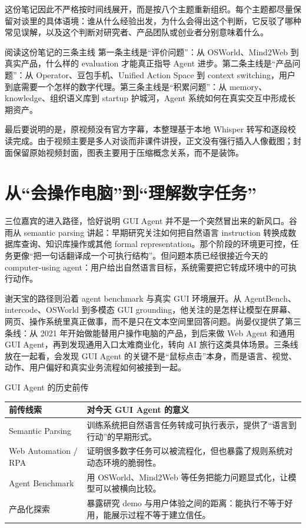 \documentclass[a4paper]{article}
\begin{document}
这份笔记因此不严格按时间线展开，而是按八个主题重新组织。每个主题都尽量保留对谈里的具体语境：谁从什么经验出发，为什么会得出这个判断，它反驳了哪种常见误解，以及这个判断对研究者、产品团队或创业者分别意味着什么。

\begin{importantbox}{阅读这份笔记的三条主线}
第一条主线是“评价问题”：从 OSWorld、Mind2Web 到真实产品，什么样的 evaluation 才能真正指导 Agent 进步。第二条主线是“产品问题”：从 Operator、豆包手机、Unified Action Space 到 context switching，用户到底需要一个怎样的数字代理。第三条主线是“积累问题”：从 memory、knowledge、组织语义库到 startup 护城河，Agent 系统如何在真实交互中形成长期资产。
\end{importantbox}

最后要说明的是，原视频没有官方字幕，本整理基于本地 Whisper 转写和逐段校读完成。由于视频主要是多人对谈而非课件讲授，正文没有强行插入人像截图；封面保留原始视频封面，图表主要用于压缩概念关系，而不是装饰。

\section{从“会操作电脑”到“理解数字任务”}

三位嘉宾的进入路径，恰好说明 GUI Agent 并不是一个突然冒出来的新风口。谷雨从 semantic parsing 讲起：早期研究关注如何把自然语言 instruction 转换成数据库查询、知识库操作或其他 formal representation。那个阶段的环境更可控，任务更像“把一句话翻译成一个可执行结构”。但问题本质已经很接近今天的 computer-using agent：用户给出自然语言目标，系统需要把它转成环境中的可执行动作。

谢天宝的路径则沿着 agent benchmark 与真实 GUI 环境展开。从 AgentBench、intercode、OSWorld 到多模态 GUI grounding，他关注的是怎样让模型在屏幕、网页、操作系统里真正做事，而不是只在文本空间里回答问题。尚晏仪提供了第三条线：从 2021 年开始做能替用户操作电脑的产品，到后来做 Web Agent 和通用 GUI Agent，再到发现通用入口太难商业化，转向 AI 旅行这类具体场景。三条线放在一起看，会发现 GUI Agent 的关键不是“鼠标点击”本身，而是语言、视觉、动作、用户偏好和真实业务流程如何被接到一起。

\begin{knowledgebox}{GUI Agent 的历史前传}
\begin{tabularx}{\textwidth}{>{\raggedright\arraybackslash}p{} Y}
\toprule
前传线索 & 对今天 GUI Agent 的意义 \\
\midrule
Semantic Parsing & 训练系统把自然语言任务转成可执行表示，提供了“语言到行动”的早期形式。 \\
Web Automation / RPA & 证明很多数字任务可以被流程化，但也暴露了规则系统对动态环境的脆弱性。 \\
Agent Benchmark & 用 OSWorld、Mind2Web 等任务把能力问题显式化，让模型可以被横向比较。 \\
产品化探索 & 暴露研究 demo 与用户体验之间的距离：能执行不等于好用，能展示过程不等于建立信任。 \\
\bottomrule
\end{tabularx}
\end{knowledgebox}
\end{document}
